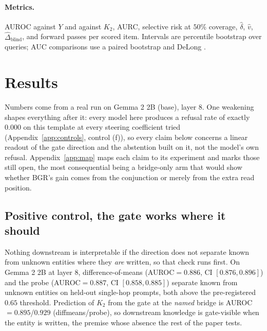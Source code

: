 \documentclass{article}
\newif\ifredflags
\newcommand{\rf}[1]{\ifredflags{\textcolor{red}{\textbf{[MISSING: #1]}}}\fi}
\newcommand{\rv}[1]{\ifredflags{\textcolor{red}{\textbf{[VERIFY: #1]}}}\fi}
\begin{document}
\paragraph{Metrics.} AUROC against $Y$ and against $K_2$, AURC, selective risk at $50\%$ coverage,
$\hat\delta$, $\hat v$, $\hat\Delta_{\mathrm{blind}}$, and forward passes per scored item. Intervals
are percentile bootstrap over queries; AUC comparisons use a paired bootstrap and DeLong
\citep{delong1988comparing}. \rf{expected calibration error \citep{guo2017calibration}, wall-clock
cost, and a risk-coverage curve on real data were all specified and none is reported. Report them or
drop them.}

\section{Results}
\label{sec:results}

Numbers come from a real run on Gemma 2 2B (base), layer 8. One weakening shapes everything after it:
every model here produces a refusal rate of exactly $0.000$ on this template at every steering
coefficient tried (Appendix~\ref{app:controls}, control (f)), so every claim below concerns a linear
readout of the gate direction and the abstention built on it, not the model's own refusal.
Appendix~\ref{app:map} maps each claim to its experiment and marks those still open, the most
consequential being a bridge-only arm that would show whether BGR's gain comes from the conjunction or
merely from the extra read position.

\subsection{Positive control, the gate works where it should}
\label{sec:res-e0}

Nothing downstream is interpretable if the direction does not separate known from unknown entities
where they \emph{are} written, so that check runs first. On Gemma 2 2B at layer 8, difference-of-means
(AUROC$=0.886$, CI $[0.876,0.896]$) and the probe
(AUROC$=0.887$, CI $[0.858,0.885]$) separate known from unknown entities on held-out single-hop
prompts, both above the pre-registered $0.65$ threshold.
\rv{the probe's reported interval excludes its own point estimate ($0.887 \notin [0.858,0.885]$).
Recompute and correct whichever of the two is wrong.} Prediction of $K_2$ from the gate
at the \emph{named} bridge is AUROC$=0.895$/$0.929$ (diffmeans/probe), so downstream knowledge is
gate-visible when the entity is written, the premise whose absence the rest of the paper tests.
\end{document}
